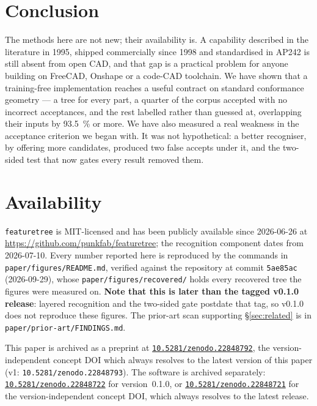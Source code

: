 \documentclass[11pt]{article}
\newcommand{\code}[1]{\texttt{\small #1}}
\begin{document}
\section{Conclusion}

The methods here are not new; their availability is. A capability described in
the literature in 1995, shipped commercially since 1998 and standardised in
AP242 is still absent from open CAD, and that gap is a practical problem for
anyone building on FreeCAD, Onshape or a code-CAD toolchain. We have shown that
a training-free implementation reaches a useful contract on standard
conformance geometry --- a tree for every part, a quarter of the corpus
accepted with no incorrect acceptances, and the rest labelled rather than
guessed at, overlapping their inputs by \SI{93.5}{\percent} or more. We have also
measured a real weakness in the acceptance criterion we began with. It was not
hypothetical: a better recogniser, by offering more candidates, produced two
false accepts under it, and the two-sided test that now gates every result
removed them.

\section*{Availability}

\code{featuretree} is MIT-licensed and has been publicly available since
2026-06-26 at \url{https://github.com/punkfab/featuretree}; the recognition
component dates from 2026-07-10. Every number reported here is reproduced by the
commands in \code{paper/figures/README.md}, verified against the repository at
commit \code{5ae85ac} (2026-09-29), whose \code{paper/figures/recovered/}
holds every recovered tree the figures were measured on. \textbf{Note that this
is later than the tagged v0.1.0 release}: layered recognition and the two-sided
gate postdate that tag, so v0.1.0 does not reproduce these figures. The prior-art scan supporting
\S\ref{sec:related} is in \code{paper/prior-art/FINDINGS.md}.

This paper is archived as a preprint at
\href{https://doi.org/10.5281/zenodo.22848792}{\texttt{10.5281/zenodo.22848792}}, the
version-independent concept DOI which always resolves to the latest version of this paper
(v1: \texttt{10.5281/zenodo.22848793}). The software is
archived separately: \href{https://doi.org/10.5281/zenodo.22848722}{\texttt{10.5281/zenodo.22848722}}
for version~0.1.0, or \href{https://doi.org/10.5281/zenodo.22848721}{\texttt{10.5281/zenodo.22848721}}
for the version-independent concept DOI, which always resolves to the latest release.



\end{document}
